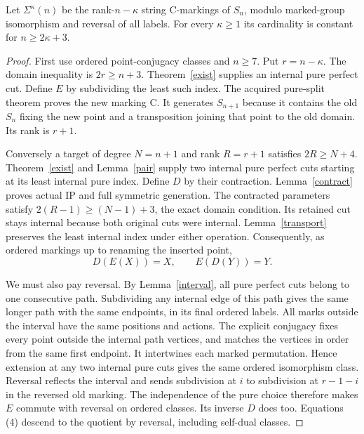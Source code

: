 \documentclass[11pt,a4paper]{article}
\begin{document}
\begin{theorem}\label{stable}
Let $\Sigma^\kappa(n)$ be the rank-$n-\kappa$ string C-markings
of $S_n$, modulo marked-group isomorphism and reversal of all labels.
For every $\kappa\ge1$ its cardinality is constant for
$n\ge2\kappa+3$.
\end{theorem}
\begin{proof}
First use ordered point-conjugacy classes and $n\ge7$. Put
$r=n-\kappa$. The domain inequality is $2r\ge n+3$.
Theorem~\ref{exist} supplies an internal pure perfect cut. Define
$E$ by subdividing the least such index. The acquired pure-split
theorem proves the new marking C. It generates $S_{n+1}$ because
it contains the old $S_n$ fixing the new point and a transposition
joining that point to the old domain. Its rank is $r+1$.

Conversely a target of degree $N=n+1$ and rank $R=r+1$ satisfies
$2R\ge N+4$. Theorem~\ref{exist} and Lemma~\ref{pair} supply
two internal pure perfect cuts starting at its least internal pure
index. Define $D$ by their contraction. Lemma~\ref{contract}
proves actual IP and full symmetric generation. The contracted
parameters satisfy $2(R-1)\ge(N-1)+3$, the exact domain condition.
Its retained cut stays internal because both original cuts were
internal. Lemma~\ref{transport} preserves the least internal index
under either operation. Consequently, as ordered markings up to
renaming the inserted point,
\[
                         D(E(X))=X,\qquad E(D(Y))=Y.     \tag{4}
\]

We must also pay reversal. By Lemma~\ref{interval}, all pure perfect
cuts belong to one consecutive path. Subdividing any internal edge
of this path gives the same longer path with the same endpoints,
in its final ordered labels. All marks outside the interval have
the same positions and actions. The explicit conjugacy fixes every
point outside the internal path vertices, and matches the vertices
in order from the same first endpoint. It intertwines each marked
permutation. Hence extension at any two internal pure cuts gives
the same ordered isomorphism class. Reversal reflects the interval
and sends subdivision at $i$ to subdivision at $r-1-i$ in the
reversed old marking. The independence of the pure choice therefore
makes $E$ commute with reversal on ordered classes. Its inverse
$D$ does too. Equations (4) descend to the quotient by reversal,
including self-dual classes.


\end{proof}
\end{document}
